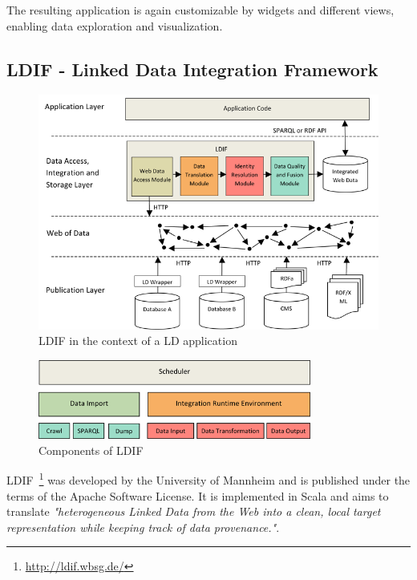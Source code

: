 The resulting application is again customizable by widgets and different views, 
enabling data exploration and visualization.

\subsection{LDIF - Linked Data Integration Framework}

\begin{figure}[htbp]
	\centering
\includegraphics[width=\textwidth]{img/ldif_context.png}
	\caption{LDIF in the context of a LD application}
	\label{ldif_context}
\end{figure}

\begin{figure}[htbp]
	\centering
\includegraphics[width=0.8\textwidth]{img/ldif_components.png}
	\caption{Components of LDIF}
	\label{ldif_components}
\end{figure}


LDIF~\footnote{\url{http://ldif.wbsg.de/}} was developed by the University of 
Mannheim and is published under the terms of the Apache Software License. It is 
implemented in Scala and aims to translate \emph{"heterogeneous Linked Data from 
the Web into a clean, local target representation while keeping track of data 
provenance."}.

